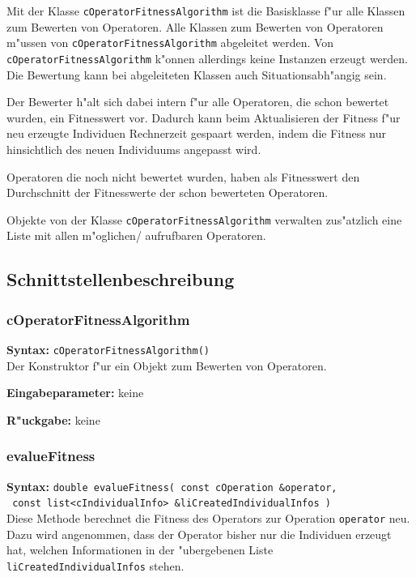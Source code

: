 Mit der Klasse \verb|cOperatorFitnessAlgorithm| ist die Basisklasse f"ur alle Klassen zum Bewerten von Operatoren. Alle Klassen zum Bewerten von Operatoren m"ussen von \verb|cOperatorFitnessAlgorithm| abgeleitet werden. Von \verb|cOperatorFitnessAlgorithm| k"onnen allerdings keine Instanzen erzeugt werden. Die Bewertung kann bei abgeleiteten Klassen auch Situationsabh"angig sein.

Der Bewerter h"alt sich dabei intern f"ur alle Operatoren, die schon bewertet wurden, ein Fitnesswert vor. Dadurch kann beim Aktualisieren der Fitness f"ur neu erzeugte Individuen Rechnerzeit gespaart werden, indem die Fitness nur hinsichtlich des neuen Individuums angepasst wird.

Operatoren die noch nicht bewertet wurden, haben als Fitnesswert den Durchschnitt der Fitnesswerte der schon bewerteten Operatoren.

Objekte von der Klasse \verb|cOperatorFitnessAlgorithm| verwalten zus"atzlich eine Liste mit allen m"oglichen/ aufrufbaren Operatoren.


\subsection{Schnittstellenbeschreibung}

\subsubsection{cOperatorFitnessAlgorithm}

\textbf{Syntax:} \verb|cOperatorFitnessAlgorithm()| \\

Der Konstruktor f"ur ein Objekt zum Bewerten von Operatoren.

\bigskip\noindent
\textbf{Eingabeparameter:} keine

\bigskip\noindent
\textbf{R"uckgabe:} keine


\subsubsection{evalueFitness}

\textbf{Syntax:} \verb|double evalueFitness( const cOperation &operator, | \\\verb| const list<cIndividualInfo> &liCreatedIndividualInfos )| \\

Diese Methode berechnet die Fitness des Operators zur Operation \verb|operator| neu. Dazu wird angenommen, dass der Operator bisher nur die Individuen erzeugt hat, welchen Informationen in der "ubergebenen Liste \verb|liCreatedIndividualInfos| stehen.

